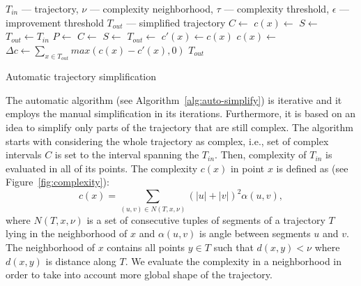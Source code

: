 
\begin{algorithm}
  \begin{algorithmic}[1]
	  \Require $T_{in}$ --- trajectory, $\nu$ --- complexity neighborhood, $\tau$ --- complexity threshold, $\epsilon$ --- improvement threshold
	  \Ensure $T_{out}$ --- simplified trajectory
			\State $C \gets$  
			\State $c(x) \gets$ 
			\State
			\State $S \gets$  
			\State $T_{out} \gets T_{in}$
			\Repeat
			  \State $P \gets$ 
				\State $C \gets$ 
			  \State
				  \State $S \gets$ 
					\State $T_{out} \gets$ 
			  \EndFor
				\State
				\State $c'(x) \gets c(x)$ %
				\State $c(x) \gets$ 
				\State
				\State $\Delta c \gets \sum_{x \in T_{out}}{max(c(x) - c'(x), 0)}$
				\State {}
			\State
			\State \Return $T_{out}$
		\EndProcedure
  \end{algorithmic}
	\caption{Automatic trajectory simplification}
  \label{alg:auto-simplify}
\end{algorithm}

The automatic algorithm (see Algorithm~\ref{alg:auto-simplify}) is iterative and it employs the manual simplification in its iterations.
Furthermore, it is based on an idea to simplify only parts of the trajectory that are still complex.
The algorithm starts with considering the whole trajectory as complex, i.e., set of complex intervals $C$ is set to the interval spanning the $T_{in}$.
Then, complexity of $T_{in}$ is evaluated in all of its points.
The complexity $c(x)$ in point $x$ is defined as (see Figure~\ref{fig:complexity}):
\begin{equation}
  c(x) = \sum_{(u, v) \in N(T, x, \nu)}{(|u| + |v|)^2 \alpha(u, v)}, %
\label{eq:complexity}
\end{equation}
where $N(T, x, \nu)$ is a set of consecutive tuples of segments of a trajectory $T$ lying in the neighborhood of $x$ and $\alpha(u, v)$ is angle between segments $u$ and $v$.
The neighborhood of $x$ contains all points $y \in T$ such that $d(x, y) < \nu$ where $d(x, y)$ is distance along $T$.
We evaluate the complexity in a neighborhood in order to take into account more global shape of the trajectory.

